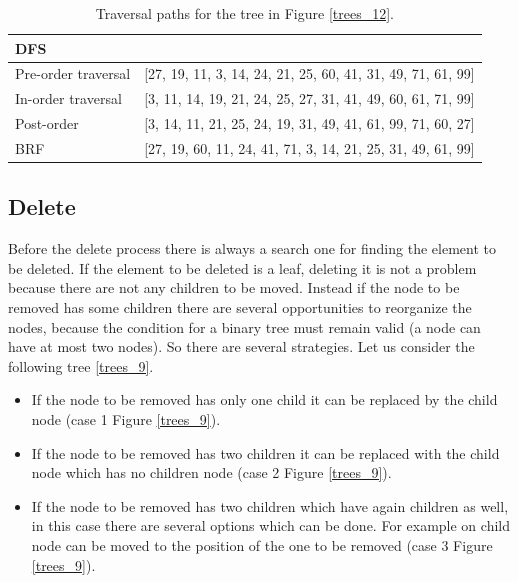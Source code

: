 \begin{table}[H]
	\centering
	\begin{tabular}{l  l}
 		 DFS & \\
		\hline
		Pre-order traversal & [27, 19, 11, 3, 14, 24, 21, 25, 60, 41, 31, 49, 71, 61, 99] \\
		In-order traversal & [3, 11, 14, 19, 21, 24, 25, 27, 31, 41, 49, 60, 61, 71, 99] \\
		Post-order & [3, 14, 11, 21, 25, 24, 19, 31, 49, 41, 61, 99, 71, 60, 27] \\
		\hline
		BRF & [27, 19, 60, 11, 24, 41, 71, 3, 14, 21, 25, 31, 49, 61, 99]
	\end{tabular}
\caption[Traversal paths for the tree in Figure \ref{trees_12}.]{Traversal paths for the tree in Figure \ref{trees_12}.}
\end{table}

\subsection{Delete}
Before the delete process there is always a search one for finding the element to be deleted. If the element to be deleted is a leaf, deleting it is not a problem because there are not any children to be moved. Instead if the node to be removed has some children there are several opportunities to reorganize the nodes, because the condition for a binary tree must remain valid (a node can have at most two nodes). So there are several strategies. Let us consider the following tree \ref{trees_9}. 
\begin{itemize}
\item If the node to be removed has only one child it can be replaced by the child node (case 1 Figure \ref{trees_9}).
\item If the node to be removed has two children it can be replaced with the child node which has no children node (case 2 Figure \ref{trees_9}).
\item If the node to be removed has two children which have again children as well, in this case there are several options which can be done. For example on child node can be moved to the position of the one to be removed (case 3 Figure \ref{trees_9}).
\end{itemize} 

